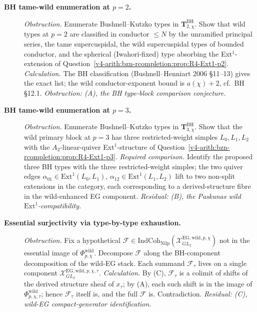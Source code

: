 \begin{description}
\item[\textbf{BH tame-wild enumeration at \(p=2\).}]
\emph{Obstruction.} Enumerate Bushnell--Kutzko types in
\(\mathbf{T}^{\mathrm{BH}}_{2,\chi}\). Show that wild types at \(p=2\)
are classified in conductor \(\leq N\) by the unramified principal
series, the tame supercuspidal, the wild supercuspidal types of
bounded conductor,
and the spherical (Iwahori-fixed) type absorbing the
Ext\({}^{1}\)-extension of
Question~\ref{v4-arith:bzn-rcompletion:prop:R4-Ext1-p2}.
\emph{Calculation.} The BH classification
(Bushnell--Henniart 2006 \S 11--13) gives the exact list; the wild
conductor-exponent bound is \(a(\chi)+2\), cf.\ BH \S 12.1.
\emph{Obstruction: (A), the BH type-block comparison conjecture.}

\item[\textbf{BH tame-wild enumeration at \(p=3\).}]
\emph{Obstruction.} Enumerate Bushnell--Kutzko types in
\(\mathbf{T}^{\mathrm{BH}}_{3,\chi}\). Show that the wild primary block
at \(p=3\) has three restricted-weight simples \(L_{0},L_{1},L_{2}\) with
the \(A_{2}\)-linear-quiver Ext\({}^{1}\)-structure of
Question~\ref{v4-arith:bzn-rcompletion:prop:R4-Ext1-p3}.
\emph{Required comparison.} Identify the proposed three BH types with the
three restricted-weight simples; the two quiver edges
\(\alpha_{01}\in\mathrm{Ext}^{1}(L_{0},L_{1})\),
\(\alpha_{12}\in\mathrm{Ext}^{1}(L_{1},L_{2})\) lift to two
non-split extensions in the category, each corresponding to a
derived-structure fibre in the wild-enhanced EG component.
\emph{Residual: (B), the Paskunas wild \(\mathrm{Ext}^{1}\)-compatibility.}

\item[\textbf{Essential surjectivity via type-by-type exhaustion.}] \emph{Obstruction.} Fix a hypothetical
\(\mathcal{F}\in\mathrm{IndCoh}_{\mathrm{Nilp}}(\mathcal{X}^{\mathrm{EG,wild},p,\chi}_{GL_{2}})\)
not in the essential image of \(\Phi^{\mathrm{wild}}_{p,\chi}\).
Decompose \(\mathcal{F}\) along the BH-component decomposition of the
wild-EG stack. Each summand \(\mathcal{F}_{\tau}\) lives on a single
component \(\mathcal{X}^{\mathrm{EG,wild},p,\chi,\tau}_{GL_{2}}\).
\emph{Calculation.} By (C), \(\mathcal{F}_{\tau}\) is a colimit of shifts of
the derived structure sheaf of \(x_{\tau}\); by (A), each such shift
is in the image of \(\Phi^{\mathrm{wild}}_{p,\chi,\tau}\); hence
\(\mathcal{F}_{\tau}\) itself is, and the full \(\mathcal{F}\) is.
Contradiction.
\emph{Residual: (C), wild-EG compact-generator identification.}


\end{description}
